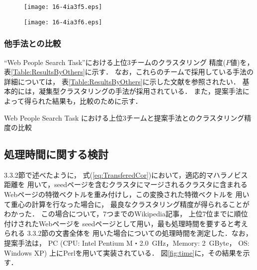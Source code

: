 \documentclass[japanese]{jnlp_1.4}
\begin{document}
\begin{figure}[t]
\begin{center}
\texttt{[image: 16-4ia3f5.eps]}
\end{center}
\label{fig:multiple seeds (Partial)}
\end{figure}
\begin{figure}[t]
\begin{center}
\texttt{[image: 16-4ia3f6.eps]}
\end{center}
\label{fig:RsltSnippet}
\end{figure}



    \subsubsection{他手法との比較}
\label{subsec:ComparisonWithOthers}

``Web People Search Task''における上位3チームのクラスタリング
精度($F値$)を，表\ref{Table:ResultsByOthers}に示す．
なお，これらのチームで採用している手法の詳細については，
表\ref{Table:ResultsByOthers}に示した文献を参照されたい．
基本的には，凝集型クラスタリングの手法が採用されている．
また，提案手法によって得られた結果も，比較のために示す．

\begin{table}[t]
 \caption{Web People Search Task における上位3チームと提案手法とのクラスタリング精度の比較}
 \label{Table:ResultsByOthers}

\end{table}


\subsection{処理時間に関する検討} 
\label{subsec:ProcessingTime}

3.3.2節で述べたように，
式(\ref{eq:TransferedCor})において，適応的マハラノビス距離を
用いて，seedページを含むクラスタにマージされるクラスタに含まれる
Webページの特徴ベクトルを重み付けし，この変換された特徴ベクトルを
用いて重心の計算を行なった場合に，
最良なクラスタリング精度が得られることがわかった．
この場合について，7つまでのWikipedia記事，
上位7位までに順位付けされたWebページを
seedページとして用い，最も処理時間を要すると考えられる
3.3.2節の文書全体を
用いた場合についての処理時間を測定した．なお，提案手法は，
PC (CPU: Intel Pentium M・2.0~GHz，Memory: 2~GByte，
OS: Windows XP) 上にPerlを用いて実装されている．
図\ref{fig:time}に，その結果を示す．
\end{document}
